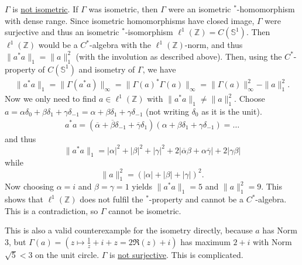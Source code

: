 \documentclass[a4paper]{article}
\newcommand{\unitcircle}{\mathds{S}^1}
\begin{document}
\begin{example}
\begin{enumerate}
		      $\Gamma$ is \underline{not isometric}.
		      If $\Gamma$ was isometric, then $\Gamma$ were an isometric $^*$-homomorphism with dense range.
		      Since isometric homomorphisms have closed image, $\Gamma$ were surjective and thus an isometric $^*$-isomorphism $\ell^1(\mathds{Z}) = C(\unitcircle)$.
		      Then $\ell^1(\mathds{Z})$ would be a $C^*$-algebra with the $\ell^1(\mathds{Z})$-norm, and thus $\|a^* a\|_1 = \|a\|_1^2$ (with the involution as described above). Then, using the $C^*$-property of $C(\unitcircle)$ and isometry of $\Gamma$, we have
		      \begin{align*}
			      \|a^* a\|_1 = \|\Gamma(a^* a)\|_\infty = \|\Gamma(a)^* \Gamma(a) \|_\infty = \|\Gamma(a)\|_\infty^2 - \|a\|_1^2\text{.}
		      \end{align*}
		      Now we only need to find $a \in \ell^1(\mathds{Z})$ with $\|a^* a \|_1 \neq \|a\|_1^2$.
		      Choose $a = \alpha \delta_0 + \beta \delta_1 + \gamma \delta_{-1} = \alpha + \beta \delta_1 + \gamma \delta_{-1}$ (not writing $\delta_0$ as it is the unit).
		      \begin{align*}
			      a^* a = (\overline{\alpha} + \overline{\beta} \delta_{-1} + \overline{\gamma} \delta_1) (\alpha + \beta \delta_1 + \gamma \delta_{-1}) = \dots
		      \end{align*}
		      and thus
		      \begin{equation*}
			      \|a^* a\|_1 = |\alpha|^2 + |\beta|^2 + |\gamma|^2 + 2 |\overline{\alpha} \beta + \alpha \overline{\gamma} | + 2 |\gamma \beta|
		      \end{equation*}
		      while
		      \begin{equation*}
			      \|a\|_1^2 = (|\alpha| + |\beta| + |\gamma|)^2\text{.}
		      \end{equation*}
		      Now choosing $\alpha = i$ and $\beta = \gamma = 1$ yields $\| a^* a\|_1 = 5$ and $\|a\|_1^2 = 9$. This shows that $\ell^1(\mathds{Z})$ does not fulfil the $^*$-property and cannot be a $C^*$-algebra. This is a contradiction, so $\Gamma$ cannot be isometric.

		      This is also a valid counterexample for the isometry directly, because $a$ has Norm $3$, but $\Gamma(a) = (z \mapsto \frac{1}{z} + i + z = 2 \Re(z) + i)$ has maximum $2 + i$ with Norm $\sqrt{5}<3$ on the unit circle.
		      $\Gamma$ is \underline{not surjective}. This is complicated.
	\end{enumerate}
\end{example}
\end{document}
